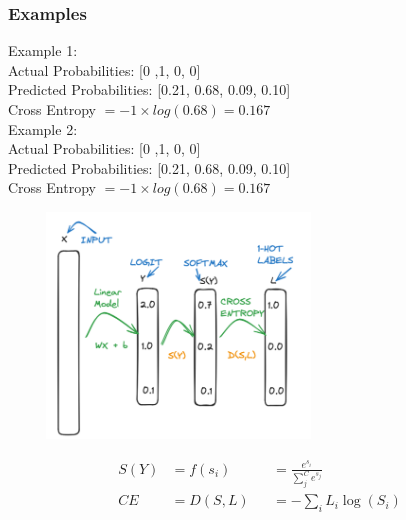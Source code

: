 \documentclass{article}
\begin{document}
\subsubsection{Examples}
Example 1: \\
Actual Probabilities: [0 ,1, 0, 0] \\
Predicted Probabilities: [0.21, 0.68, 0.09, 0.10] \\
Cross Entropy  $ = -1 \times log(0.68) = 0.167 $ \\
Example 2: \\
Actual Probabilities: [0 ,1, 0, 0] \\
Predicted Probabilities: [0.21, 0.68, 0.09, 0.10] \\
Cross Entropy  $ = -1 \times log(0.68) = 0.167 $ \\
\begin{center}
    \includegraphics[width=9cm, height=6cm]{Topics/IMAGES/CrossEntropy1.png} 
\end{center}
\begin{align*}
    S(Y) &= f(s_i) &&= \frac{e^{s_i}}{\sum_j^C e^{s_j}} \\
    CE &= D(S,L) &&= - \sum_i L_i \log(S_i)
\end{align*}
\end{document}
